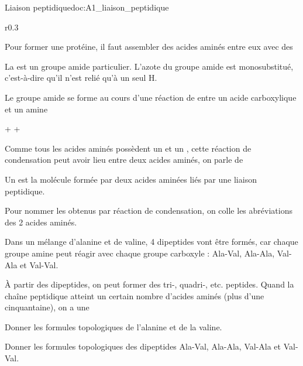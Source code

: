 \begin{doc}{Liaison peptidique}{doc:A1_liaison_peptidique}
  \begin{wrapfigure}[3]{r}{0.3\linewidth}
    \centering

  \end{wrapfigure}
  
  Pour former une protéine, il faut assembler des acides aminés entre eux avec des 

  \begin{importants}
    La  est un groupe amide particulier.
    L'azote du groupe amide est monosubstitué, c'est-à-dire qu'il n'est relié qu'à un seul H.
  \end{importants}

  Le groupe amide se forme au cours d'une réaction de  entre un acide carboxylique et un amine
  \vspace*{-4pt}
  
  \begin{center}
     +   
    \reaction
     +
  \end{center}
  \vspace*{-4pt}

  Comme tous les acides aminés possèdent un  et un , cette réaction de condensation peut avoir lieu entre deux acides aminés, on parle de 

  \begin{importants}
    Un  est la molécule formée par deux acides aminées liés par une liaison peptidique.
    
    Pour nommer les  obtenus par réaction de condensation, on colle les abréviations des 2 acides aminés.
  \end{importants}

  Dans un mélange  d'alanine et de valine, 4 dipeptides vont être formés, car chaque groupe amine peut réagir avec chaque groupe carboxyle :
  Ala-Val, Ala-Ala, Val-Ala et Val-Val.

  \begin{importants}  
    À partir des dipeptides, on peut former des tri-, quadri-, etc. peptides.
    Quand la chaîne peptidique atteint un certain nombre d'acides aminés (plus d'une cinquantaine), on a une 
  \end{importants}
\end{doc}

\numeroQuestion
Donner les formules topologiques de l'alanine et de la valine.
\vspace*{5cm}

\numeroQuestion
Donner les formules topologiques des dipeptides Ala-Val, Ala-Ala, Val-Ala et Val-Val.
